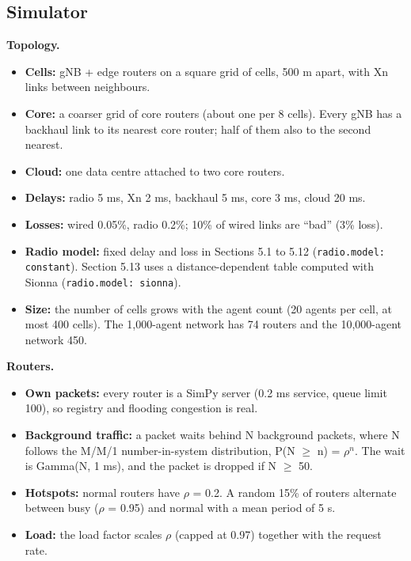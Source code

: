\documentclass[journal]{IEEEtran}
\begin{document}
\subsection{Simulator}
\textbf{Topology.}

\begin{itemize}
\item \textbf{Cells:} gNB + edge routers on a square grid of cells, 500 m apart, with Xn links between neighbours.
\item \textbf{Core:} a coarser grid of core routers (about one per 8 cells). Every gNB has a backhaul link to its nearest core router; half of them also to the second nearest.
\item \textbf{Cloud:} one data centre attached to two core routers.
\item \textbf{Delays:} radio 5 ms, Xn 2 ms, backhaul 5 ms, core 3 ms, cloud 20 ms.
\item \textbf{Losses:} wired 0.05\%, radio 0.2\%; 10\% of wired links are ``bad'' (3\% loss).
\item \textbf{Radio model:} fixed delay and loss in Sections 5.1 to 5.12 (\texttt{radio.model: constant}). Section 5.13 uses a distance-dependent table computed with Sionna (\texttt{radio.model: sionna}).
\item \textbf{Size:} the number of cells grows with the agent count (20 agents per cell, at most 400 cells). The 1,000-agent network has 74 routers and the 10,000-agent network 450.
\end{itemize}

\textbf{Routers.}

\begin{itemize}
\item \textbf{Own packets:} every router is a SimPy server (0.2 ms service, queue limit 100), so registry and flooding congestion is real.
\item \textbf{Background traffic:} a packet waits behind N background packets, where N follows the M/M/1 number-in-system distribution, P(N $\geq$ n) = $\rho^{n}$. The wait is Gamma(N, 1 ms), and the packet is dropped if N $\geq$ 50.
\item \textbf{Hotspots:} normal routers have $\rho$ = 0.2. A random 15\% of routers alternate between busy ($\rho$ = 0.95) and normal with a mean period of 5 s.
\item \textbf{Load:} the load factor scales $\rho$ (capped at 0.97) together with the request rate.
\end{itemize}
\end{document}

